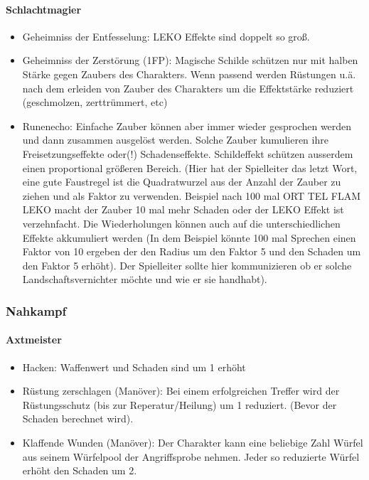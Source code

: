 \documentclass{article}
\begin{document}
\paragraph{Schlachtmagier}

\begin{itemize}
\item Geheimniss der Entfesselung: LEKO Effekte sind doppelt so groß.
\item Geheimniss der Zerstörung (1FP): Magische Schilde schützen nur mit halben Stärke gegen Zaubers des Charakters. Wenn passend werden Rüstungen u.ä. nach dem erleiden von Zauber des Charakters um die Effektstärke reduziert (geschmolzen, zerttrümmert, etc)
\item Runenecho: Einfache Zauber können aber immer wieder gesprochen werden und dann zusammen ausgelöst werden. Solche Zauber kumulieren ihre Freisetzungseffekte oder(!) Schadenseffekte. Schildeffekt schützen ausserdem einen proportional größeren Bereich. (Hier hat der Spielleiter das letzt Wort, eine gute Faustregel ist die Quadratwurzel aus der Anzahl der Zauber zu ziehen und als Faktor zu verwenden. Beispiel nach 100 mal ORT TEL FLAM LEKO macht der Zauber 10 mal mehr Schaden oder der LEKO Effekt ist verzehnfacht. Die Wiederholungen können auch auf die unterschiedlichen Effekte akkumuliert werden (In dem Beispiel könnte 100 mal Sprechen einen Faktor von 10 ergeben der den Radius um den Faktor 5 und den Schaden um den Faktor 5 erhöht). Der Spielleiter sollte hier kommunizieren ob er solche Landschaftsvernichter möchte und wie er sie handhabt).
\end{itemize}

\subsubsection{Nahkampf}

\paragraph{Axtmeister}

\begin{itemize}
\item Hacken: Waffenwert und Schaden sind um 1 erhöht
\item Rüstung zerschlagen (Manöver): Bei einem erfolgreichen Treffer wird der Rüstungsschutz (bis zur Reperatur/Heilung) um 1 reduziert. (Bevor der Schaden berechnet wird).
\item Klaffende Wunden (Manöver): Der Charakter kann eine beliebige Zahl Würfel aus seinem Würfelpool der Angriffsprobe nehmen. Jeder so reduzierte Würfel erhöht den Schaden um 2.
\end{itemize}
\end{document}
